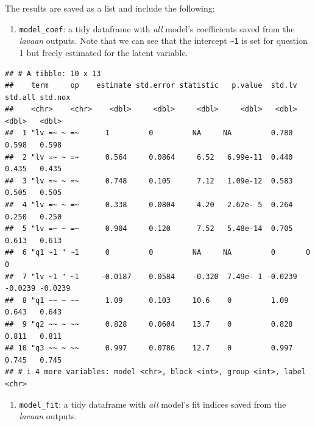 \documentclass[
  man]{apa7}
\newenvironment{Shaded}{\begin{snugshade}}{\end{snugshade}}
\newcommand{\DecValTok}[1]{\textcolor[rgb]{0.00,0.00,0.81}{#1}}
\newcommand{\NormalTok}[1]{#1}
\newcommand{\SpecialCharTok}[1]{\textcolor[rgb]{0.00,0.00,0.00}{#1}}
\providecommand{\tightlist}{%
  \setlength{\itemsep}{0pt}\setlength{\parskip}{0pt}}
\begin{document}
The results are saved as a list and include the following:

\begin{enumerate}
\def\labelenumi{\arabic{enumi})}
\tightlist
\item
  \texttt{model\_coef}: a tidy dataframe with \emph{all} model's coefficients saved from the \emph{lavaan} outputs. Note that we can see that the intercept \texttt{\textasciitilde{}1} is set for question 1 but freely estimated for the latent variable.
\end{enumerate}

\small

\begin{Shaded}
\end{Shaded}

\normalsize

\begin{verbatim}
## # A tibble: 10 x 13
##    term     op    estimate std.error statistic   p.value  std.lv std.all std.nox
##    <chr>    <chr>    <dbl>     <dbl>     <dbl>     <dbl>   <dbl>   <dbl>   <dbl>
##  1 "lv =~ ~ =~      1         0         NA     NA         0.780   0.598   0.598 
##  2 "lv =~ ~ =~      0.564     0.0864     6.52   6.99e-11  0.440   0.435   0.435 
##  3 "lv =~ ~ =~      0.748     0.105      7.12   1.09e-12  0.583   0.505   0.505 
##  4 "lv =~ ~ =~      0.338     0.0804     4.20   2.62e- 5  0.264   0.250   0.250 
##  5 "lv =~ ~ =~      0.904     0.120      7.52   5.48e-14  0.705   0.613   0.613 
##  6 "q1 ~1 " ~1      0         0         NA     NA         0       0       0     
##  7 "lv ~1 " ~1     -0.0187    0.0584    -0.320  7.49e- 1 -0.0239 -0.0239 -0.0239
##  8 "q1 ~~ ~ ~~      1.09      0.103     10.6    0         1.09    0.643   0.643 
##  9 "q2 ~~ ~ ~~      0.828     0.0604    13.7    0         0.828   0.811   0.811 
## 10 "q3 ~~ ~ ~~      0.997     0.0786    12.7    0         0.997   0.745   0.745 
## # i 4 more variables: model <chr>, block <int>, group <int>, label <chr>
\end{verbatim}

\begin{enumerate}
\def\labelenumi{\arabic{enumi})}
\setcounter{enumi}{1}
\tightlist
\item
  \texttt{model\_fit}: a tidy dataframe with \emph{all} model's fit indices saved from the \emph{lavaan} outputs.
\end{enumerate}
\end{document}
